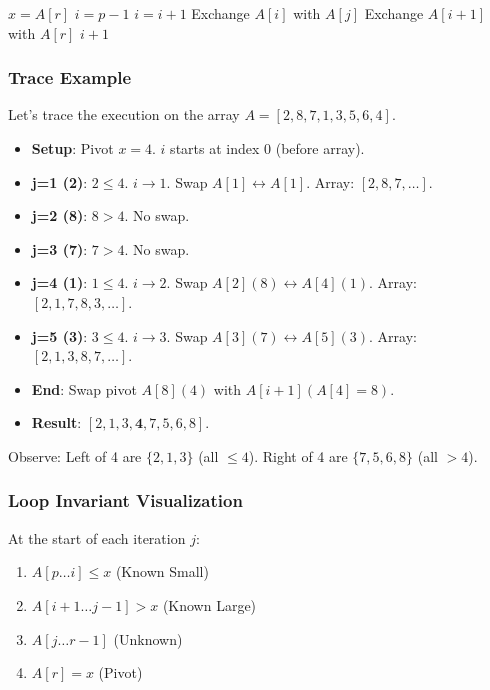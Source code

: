 \documentclass[12pt]{article}
\theoremstyle{blueplain}
\theoremstyle{bluedef}
\theoremstyle{blueremark}
\begin{document}
\begin{algorithm}
    \caption{Partition (A, p, r)}\label{alg:partition}
    \begin{algorithmic}[1]
        \State $x = A[r]$ 
        \State $i = p - 1$ 
         
        \State $i = i + 1$ 
        \State Exchange $A[i]$ with $A[j]$ 
        \EndIf
        \EndFor
        \State Exchange $A[i+1]$ with $A[r]$ 
        \State \Return $i + 1$ 
        \EndProcedure
    \end{algorithmic}
\end{algorithm}

\subsubsection{Trace Example}
Let's trace the execution on the array $A = [2, 8, 7, 1, 3, 5, 6, 4]$.
\begin{itemize}
    \item \textbf{Setup}: Pivot $x=4$. $i$ starts at index 0 (before array).
    \item \textbf{j=1 (2)}: $2 \le 4$. $i \to 1$. Swap $A[1] \leftrightarrow A[1]$. Array: $[2, 8, 7, \dots]$.
    \item \textbf{j=2 (8)}: $8 > 4$. No swap.
    \item \textbf{j=3 (7)}: $7 > 4$. No swap.
    \item \textbf{j=4 (1)}: $1 \le 4$. $i \to 2$. Swap $A[2] (8) \leftrightarrow A[4] (1)$. Array: $[2, 1, 7, 8, 3, \dots]$.
    \item \textbf{j=5 (3)}: $3 \le 4$. $i \to 3$. Swap $A[3] (7) \leftrightarrow A[5] (3)$. Array: $[2, 1, 3, 8, 7, \dots]$.
    \item \textbf{End}: Swap pivot $A[8] (4)$ with $A[i+1] (A[4]=8)$.
    \item \textbf{Result}: $[2, 1, 3, \mathbf{4}, 7, 5, 6, 8]$.
\end{itemize}
Observe: Left of 4 are $\{2, 1, 3\}$ (all $\le 4$). Right of 4 are $\{7, 5, 6, 8\}$ (all $> 4$).

\subsubsection{Loop Invariant Visualization}
At the start of each iteration $j$:
\begin{enumerate}
    \item $A[p \dots i] \le x$ (Known Small)
    \item $A[i+1 \dots j-1] > x$ (Known Large)
    \item $A[j \dots r-1]$ (Unknown)
    \item $A[r] = x$ (Pivot)
\end{enumerate}
\end{document}
